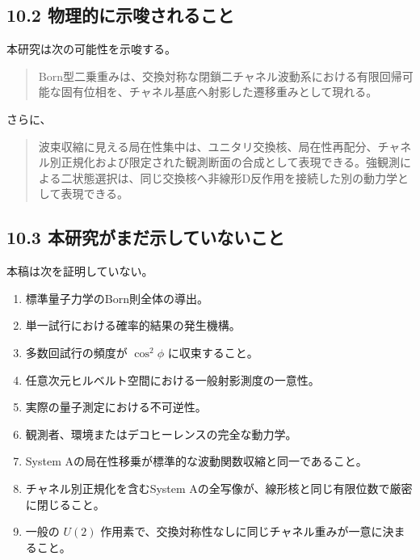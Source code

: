 \documentclass[
  a4paper,
  10pt]{article}
\providecommand{\tightlist}{%
  \setlength{\itemsep}{0pt}\setlength{\parskip}{0pt}}
\begin{document}
\subsection{10.2
物理的に示唆されること}\label{102-ux7269ux7406ux7684ux306bux793aux5506ux3055ux308cux308bux3053ux3068}

本研究は次の可能性を示唆する。

\begin{quote}
Born型二乗重みは、交換対称な閉鎖二チャネル波動系における有限回帰可能な固有位相を、チャネル基底へ射影した遷移重みとして現れる。
\end{quote}

さらに、

\begin{quote}
波束収縮に見える局在性集中は、ユニタリ交換核、局在性再配分、チャネル別正規化および限定された観測断面の合成として表現できる。強観測による二状態選択は、同じ交換核へ非線形D反作用を接続した別の動力学として表現できる。
\end{quote}

\subsection{10.3
本研究がまだ示していないこと}\label{103-ux672cux7814ux7a76ux304cux307eux3060ux793aux3057ux3066ux3044ux306aux3044ux3053ux3068}

本稿は次を証明していない。

\begin{enumerate}
\def\labelenumi{\arabic{enumi}.}
\tightlist
\item
  標準量子力学のBorn則全体の導出。
\item
  単一試行における確率的結果の発生機構。
\item
  多数回試行の頻度が \(\cos^2\phi\) に収束すること。
\item
  任意次元ヒルベルト空間における一般射影測度の一意性。
\item
  実際の量子測定における不可逆性。
\item
  観測者、環境またはデコヒーレンスの完全な動力学。
\item
  System Aの局在性移乗が標準的な波動関数収縮と同一であること。
\item
  チャネル別正規化を含むSystem
  Aの全写像が、線形核と同じ有限位数で厳密に閉じること。
\item
  一般の \(U(2)\)
  作用素で、交換対称性なしに同じチャネル重みが一意に決まること。
\end{enumerate}
\end{document}
